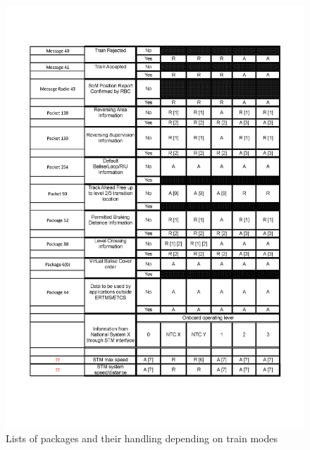 \begin{figure}
\centering
\includegraphics [scale=0.6]{images/LevelFilter4}
\caption{Lists of packages and their handling depending on train modes}
\label{fig:PackagesListLevel}
\end{figure}



